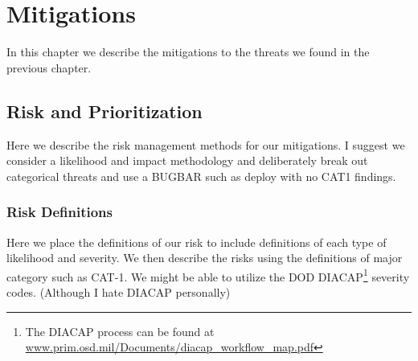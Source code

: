 \chapter{Mitigations}
\label{ch:mitigations}
In this chapter we describe the mitigations to the threats we found in the previous chapter.

\section{Risk and Prioritization}
\label{sec:risk}
Here we describe the risk management methods for our mitigations. I suggest we consider a likelihood and impact methodology and deliberately break out categorical threats and use a BUGBAR such as deploy with no CAT1 findings.

\subsection{Risk Definitions}
Here we place the definitions of our risk to include definitions of each type of likelihood and severity.  We then describe the risks using the definitions of major category such as CAT-1.  We might be able to utilize the DOD DIACAP\footnote{The DIACAP process can be found at \url{www.prim.osd.mil/Documents/diacap_workflow_map.pdf}} severity codes.  (Although I hate DIACAP personally)
